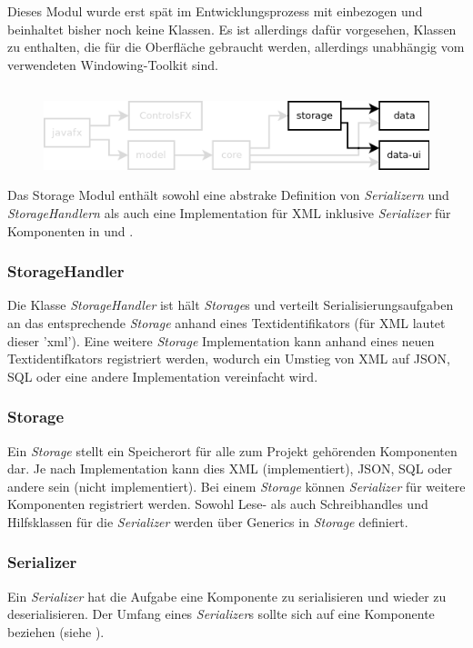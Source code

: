 Dieses Modul wurde erst spät im Entwicklungsprozess mit einbezogen und beinhaltet bisher noch keine Klassen.
Es ist allerdings dafür vorgesehen, Klassen zu enthalten, die für die Oberfläche gebraucht werden, allerdings
unabhängig vom verwendeten Windowing-Toolkit sind.




\subsection{\textModStorage}
\label{\textModStorage}
\begin{figure}[h!]
	\centering
	\includegraphics[width=.8\textwidth]{module_dependencies_storage.png}
\end{figure}

Das Storage Modul enthält sowohl eine abstrake Definition von \textit{Serializern} und \textit{StorageHandlern}
als auch eine Implementation für XML inklusive \textit{Serializer} für Komponenten in  und
.

\subsubsection{StorageHandler}
Die Klasse \textit{StorageHandler} ist hält \textit{Storage}s und verteilt Serialisierungsaufgaben an
das entsprechende \textit{Storage} anhand eines Textidentifikators (für XML lautet dieser 'xml').
Eine weitere \textit{Storage} Implementation kann anhand eines neuen Textidentifkators registriert werden,
wodurch ein Umstieg von XML auf JSON, SQL oder eine andere Implementation vereinfacht wird.

\subsubsection{Storage}
Ein \textit{Storage} stellt ein Speicherort für alle zum Projekt gehörenden Komponenten dar. Je nach
Implementation kann dies XML (implementiert), JSON, SQL oder andere sein (nicht implementiert). Bei einem
\textit{Storage} können \textit{Serializer} für weitere Komponenten registriert werden. Sowohl Lese- als
auch Schreibhandles und Hilfsklassen für die \textit{Serializer} werden über Generics in \textit{Storage}
definiert.

\subsubsection{Serializer}
Ein \textit{Serializer} hat die Aufgabe eine Komponente zu serialisieren und wieder zu deserialisieren.
Der Umfang eines \textit{Serializer}s sollte sich auf eine Komponente beziehen (siehe ).